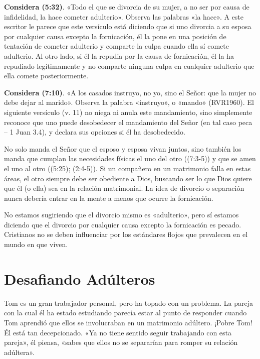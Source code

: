 \documentclass[12pt, twoside, openright]{book}
\begin{document}
\textbf{Considera (5:32)}. «Todo el que se divorcia de su mujer, a no ser por causa de infidelidad, la hace cometer adulterio». Observa las palabras «la hace». A este escritor le parece que este versículo está diciendo que si uno divorcia a su esposa por cualquier causa excepto la fornicación, él la pone en una posición de tentación de cometer adulterio y comparte la culpa cuando ella sí comete adulterio. Al otro lado, si él la repudia por la causa de fornicación, él la ha repudiado legítimamente y no comparte ninguna culpa en cualquier adulterio que ella comete posteriormente. 

\textbf{Considera (7:10)}. «A los casados instruyo, no yo, sino el Señor: que la mujer no debe dejar al marido». Observa la palabra «instruyo», o «mando» (RVR1960). El siguiente versículo (v. 11) no niega ni anula este mandamiento, sino simplemente reconoce que uno puede desobedecer el mandamiento del Señor (en tal caso peca – 1 Juan 3.4), y declara sus opciones si él ha desobedecido.

No solo manda el Señor que el esposo y esposa vivan juntos, sino también los manda que cumplan las necesidades físicas el uno del otro ((7:3-5)) y que se amen el uno al otro ((5:25); (2:4-5)). Si un compañero en un matrimonio falla en estas áreas, el otro siempre debe ser obediente a Dios, buscando ser lo que Dios quiere que él (o ella) sea en la relación matrimonial. La idea de divorcio o separación nunca debería entrar en la mente a menos que ocurre la fornicación.

No estamos sugiriendo que el divorcio mismo es «adulterio», pero sí estamos diciendo que el divorcio por cualquier causa excepto la fornicación es pecado. Cristianos no se deben influenciar por los estándares flojos que prevalecen en el mundo en que viven. 

\section{Desafiando Adúlteros}
Tom es un gran trabajador personal, pero ha topado con un problema. La pareja con la cual él ha estado estudiando parecía estar al punto de responder cuando Tom aprendió que ellos se involucraban en un matrimonio adúltero. ¡Pobre Tom! Él está tan decepcionado. «Ya no tiene sentido seguir trabajando con esta pareja», él piensa, «sabes que ellos no se separarían para romper su relación adúltera».
\end{document}
